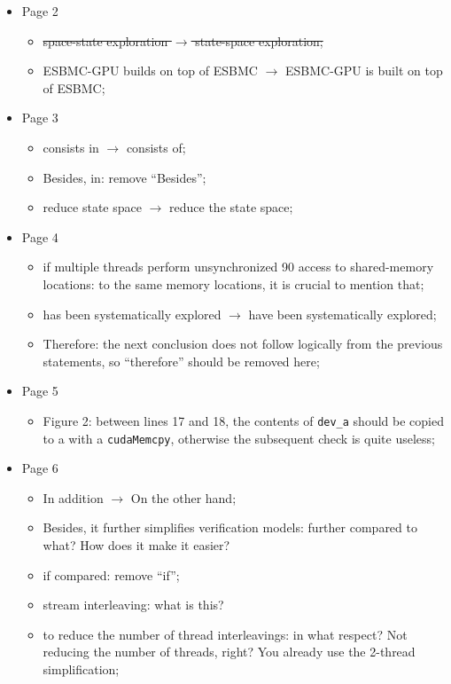 \documentclass[12pt]{article}
\begin{document}
\begin{itemize}
\item Page 2
  \begin{itemize}
  \item \sout{space-state exploration $\rightarrow$ state-space exploration;}
  \item ESBMC-GPU builds on top of ESBMC $\rightarrow$ ESBMC-GPU is built on top of ESBMC;
  \end{itemize}
\item Page 3
  \begin{itemize}
  \item consists in $\rightarrow$ consists of;
  \item Besides, in: remove ``Besides'';
  \item reduce state space $\rightarrow$ reduce the state space;
  \end{itemize}
\item Page 4
  \begin{itemize}
  \item if multiple threads perform unsynchronized 90 access to shared-memory locations: to the same memory locations, it is crucial to mention that;
  \item has been systematically explored $\rightarrow$ have been systematically explored;
  \item Therefore: the next conclusion does not follow logically from the previous statements, so ``therefore'' should be removed here;
  \end{itemize}
\item Page 5
  \begin{itemize}
  \item Figure 2: between lines 17 and 18, the contents of {\tt dev\_a} should be copied to a with a {\tt cudaMemcpy}, otherwise the subsequent check is quite useless;
  \end{itemize}
\item Page 6
  \begin{itemize}
  \item In addition $\rightarrow$ On the other hand;
  \item Besides, it further simplifies verification models: further compared to what? How does it make it easier?
  \item if compared: remove ``if'';
  \item stream interleaving: what is this?
  \item  to reduce the number of thread interleavings: in what respect? Not reducing the number of threads, right? You already use the 2-thread simplification;
  \end{itemize}
\end{itemize}
\end{document}
